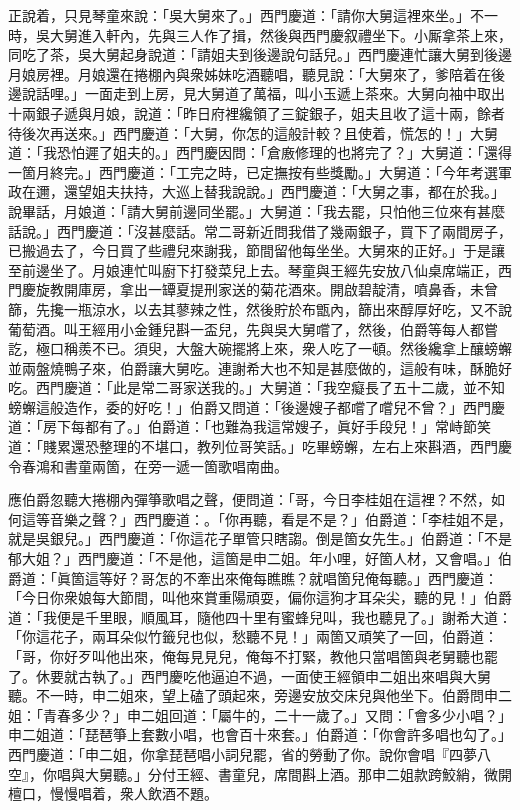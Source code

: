 正說着，只見琴童來說：「吳大舅來了。」西門慶道：「請你大舅這裡來坐。」不一時，吳大舅進入軒內，先與三人作了揖，然後與西門慶叙禮坐下。小厮拿茶上來，同吃了茶，吳大舅起身說道：「請姐夫到後邊說句話兒。」西門慶連忙讓大舅到後邊月娘房裡。月娘還在捲棚內與衆姊妹吃酒聽唱，聽見說：「大舅來了，爹陪着在後邊說話哩。」一面走到上房，見大舅道了萬福，叫小玉遞上茶來。大舅向袖中取出十兩銀子遞與月娘，說道：「昨日府裡纔領了三錠銀子，姐夫且收了這十兩，餘者待後次再送來。」西門慶道：「大舅，你怎的這般計較？且使着，慌怎的！」大舅道：「我恐怕遲了姐夫的。」西門慶因問：「倉廒修理的也將完了？」大舅道：「還得一箇月終完。」西門慶道：「工完之時，已定撫按有些獎勵。」大舅道：「今年考選軍政在邇，還望姐夫扶持，大巡上替我說說。」西門慶道：「大舅之事，都在於我。」說畢話，月娘道：「請大舅前邊同坐罷。」大舅道：「我去罷，只怕他三位來有甚麼話說。」西門慶道：「沒甚麼話。常二哥新近問我借了幾兩銀子，買下了兩間房子，已搬過去了，今日買了些禮兒來謝我，節間留他每坐坐。大舅來的正好。」于是讓至前邊坐了。月娘連忙叫廚下打發菜兒上去。琴童與王經先安放八仙桌席端正，西門慶旋教開庫房，拿出一罈夏提刑家送的菊花酒來。開啟碧靛清，噴鼻香，未曾篩，先攙一瓶涼水，以去其蓼辣之性，然後貯於布甑內，篩出來醇厚好吃，又不說葡萄酒。叫王經用小金鍾兒斟一盃兒，先與吳大舅嚐了，然後，伯爵等每人都嘗訖，極口稱羨不已。須臾，大盤大碗擺將上來，衆人吃了一頓。然後纔拿上釀螃蠏並兩盤燒鴨子來，伯爵讓大舅吃。連謝希大也不知是甚麼做的，這般有味，酥脆好吃。西門慶道：「此是常二哥家送我的。」大舅道：「我空癡長了五十二歲，並不知螃蠏這般造作，委的好吃！」伯爵又問道：「後邊嫂子都嚐了嚐兒不曾？」西門慶道：「房下每都有了。」伯爵道：「也難為我這常嫂子，眞好手段兒！」常峙節笑道：「賤累還恐整理的不堪口，教列位哥笑話。」吃畢螃蠏，左右上來斟酒，西門慶令春鴻和書童兩箇，在旁一遞一箇歌唱南曲。

應伯爵忽聽大捲棚內彈箏歌唱之聲，便問道：「哥，今日李桂姐在這裡？不然，如何這等音樂之聲？」西門慶道：。「你再聽，看是不是？」伯爵道：「李桂姐不是，就是吳銀兒。」西門慶道：「你這花子單管只瞎謅。倒是箇女先生。」伯爵道：「不是郁大姐？」西門慶道：「不是他，這箇是申二姐。年小哩，好箇人材，又會唱。」伯爵道：「眞箇這等好？哥怎的不牽出來俺每瞧瞧？就唱箇兒俺每聽。」西門慶道：「今日你衆娘每大節間，叫他來賞重陽頑耍，偏你這狗才耳朵尖，聽的見！」伯爵道：「我便是千里眼，順風耳，隨他四十里有蜜蜂兒叫，我也聽見了。」謝希大道：「你這花子，兩耳朵似竹籤兒也似，愁聽不見！」兩箇又頑笑了一回，伯爵道：「哥，你好歹叫他出來，俺每見見兒，俺每不打緊，教他只當唱箇與老舅聽也罷了。休要就古執了。」西門慶吃他逼迫不過，一面使王經領申二姐出來唱與大舅聽。不一時，申二姐來，望上磕了頭起來，旁邊安放交床兒與他坐下。伯爵問申二姐：「青春多少？」申二姐回道：「屬牛的，二十一歲了。」又問：「會多少小唱？」申二姐道：「琵琶箏上套數小唱，也會百十來套。」伯爵道：「你會許多唱也勾了。」西門慶道：「申二姐，你拿琵琶唱小詞兒罷，省的勞動了你。說你會唱『四夢八空』，你唱與大舅聽。」分付王經、書童兒，席間斟上酒。那申二姐款跨鮫綃，微開檀口，慢慢唱着，衆人飲酒不題。

